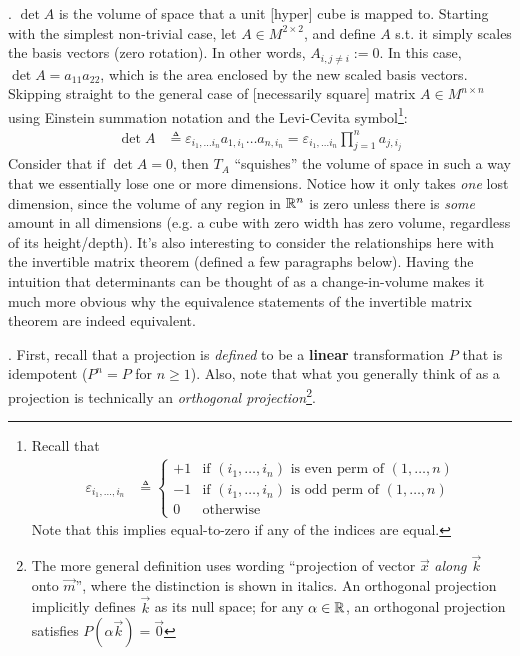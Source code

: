 \documentclass[11pt]{article}
\begin{document}
\myspace
\p {}. $\det A$ is the volume of space that a unit [hyper] cube is mapped to. Starting with the simplest non-trivial case, let $A \in M^{2 \times 2}$, and define $A$ s.t. it simply scales the basis vectors (zero rotation). In other words, $A_{i, j{\ne}i} := 0$. In this case, $\det{A} = a_{11}a_{22}$, which is the area enclosed by the new scaled basis vectors. Skipping straight to the general case of [necessarily square] matrix $A \in M^{n \times n}$ using Einstein summation notation and the Levi-Cevita symbol\footnote{Recall that 
	\begin{align}
		\varepsilon_{i_1, \ldots, i_n}
			&\triangleq \begin{cases}
				+1 & \text{if }(i_1, \ldots, i_n)\text{ is even perm of }(1, \ldots, n) \\
				-1 & \text{if }(i_1, \ldots, i_n)\text{ is odd perm of }(1, \ldots, n) \\
				0 & \text{otherwise}
			\end{cases}
	\end{align}
	Note that this implies equal-to-zero if any of the indices are equal.
}:
\begin{align}
	\det A
		&\triangleq \varepsilon_{i_1, \ldots i_n} a_{1, i_1} \ldots a_{n, i_n}
		= \varepsilon_{i_1, \ldots i_n} \prod_{j=1}^{n} a_{j, i_j}
\end{align}
Consider that if $\det A = 0$, then $T_A$ ``squishes'' the volume of space in such a way that we essentially lose one or more dimensions. Notice how it only takes \textit{one} lost dimension, since the volume of any region in $\mathbb{R}^n$ is zero unless there is \textit{some} amount in all dimensions (e.g. a cube with zero width has zero volume, regardless of its height/depth). It's also interesting to consider the relationships here with the invertible matrix theorem (defined a few paragraphs below). Having the intuition that determinants can be thought of as a change-in-volume makes it much more obvious why the equivalence statements of the invertible matrix theorem are indeed equivalent. 

\myspace
\p {}. First, recall that a projection is \textit{defined} to be a \textbf{linear} transformation $P$ that is idempotent ($P^n = P$ for $n \ge 1$). Also, note that what you generally think of as a projection is technically an \textit{orthogonal projection}\footnote{The more general definition uses wording ``projection of vector $\vec x$ \textit{along $\vec k$} onto $\vec m$'', where the distinction is shown in italics. An orthogonal projection implicitly defines $\vec k$ as its null space; for any $\alpha \in \mathbb{R}$, an orthogonal projection satisfies $P( \alpha \vec k) = \vec 0$}. \\
\end{document}
